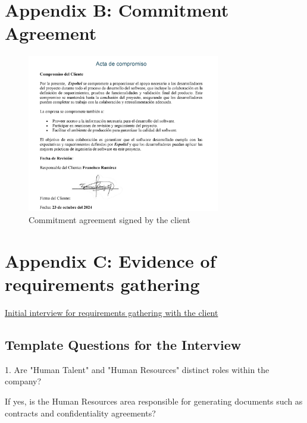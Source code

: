\documentclass{scrreprt}
\begin{document}
\section{Appendix B: Commitment Agreement}
 \begin{figure}
    \centering \small
    \includegraphics[width=0.75\textwidth]{CommitmentAgreement.jpg}
    \caption{Commitment agreement signed by the client}
    \end{figure}
\FloatBarrier 

\section{Appendix C: Evidence of requirements gathering}
\href{https://drive.google.com/file/d/1h30RbdVEBx5Qlg8GVXav69ps1Y7cQVRv/view?usp=drive_link}{Initial interview for requirements gathering with the client}
\subsection*{Template Questions for the Interview}

1. Are "Human Talent" and "Human Resources" distinct roles within the company?

    If yes, is the Human Resources area responsible for generating documents such as contracts and confidentiality agreements?\\
\end{document}
